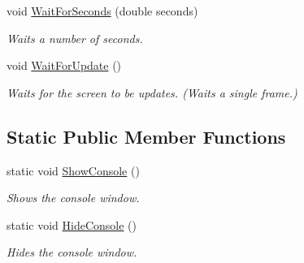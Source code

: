 \begin{DoxyCompactItemize}
void \mbox{\hyperlink{class_s_g_l_1_1_graph_aac0d51ab73e1f78788e9ecb6afc9d532}{Wait\+For\+Seconds}} (double seconds)
\begin{DoxyCompactList}\small\item\em Waits a number of seconds. \end{DoxyCompactList}\item 
void \mbox{\hyperlink{class_s_g_l_1_1_graph_ab4b0c60affd657436340a67b2e9ac2bd}{Wait\+For\+Update}} ()
\begin{DoxyCompactList}\small\item\em Waits for the screen to be updates. (Waits a single frame.) \end{DoxyCompactList}\end{DoxyCompactItemize}
\subsection*{Static Public Member Functions}
\begin{DoxyCompactItemize}
\item 
static void \mbox{\hyperlink{class_s_g_l_1_1_graph_ab5ae05aa7165b934f951e0a2fb451c8d}{Show\+Console}} ()
\begin{DoxyCompactList}\small\item\em Shows the console window. \end{DoxyCompactList}\item 
static void \mbox{\hyperlink{class_s_g_l_1_1_graph_ab88069c5a9c545be680996d876fad41f}{Hide\+Console}} ()
\begin{DoxyCompactList}\small\item\em Hides the console window. \end{DoxyCompactList}\end{DoxyCompactItemize}
